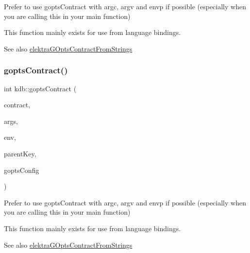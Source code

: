 Prefer to use gopts\+Contract with argc, argv and envp if possible (especially when you are calling this in your main function) 

This function mainly exists for use from language bindings.

\begin{DoxySeeAlso}{See also}
\hyperlink{kdbgopts_8h_ade81f23438c00b284247955e8b4b207d}{elektra\+G\+Opts\+Contract\+From\+Strings} 
\end{DoxySeeAlso}
\mbox{\label{namespacekdb_afa8d46930ac176c22c7f4e77c776d08e}} 
\subsubsection{\texorpdfstring{gopts\+Contract()}{goptsContract()}\hspace{0.1cm}{\footnotesize\ttfamily [3/3]}}
{\footnotesize\ttfamily int kdb\+::gopts\+Contract (\begin{DoxyParamCaption}\item[{\hyperlink{classkdb_1_1KeySet}{kdb\+::\+Key\+Set} \&}]{contract,  }\item[{const std\+::vector$<$ std\+::string $>$ \&}]{args,  }\item[{const std\+::vector$<$ std\+::string $>$ \&}]{env,  }\item[{const \hyperlink{classkdb_1_1Key}{kdb\+::\+Key} \&}]{parent\+Key,  }\item[{\hyperlink{classkdb_1_1KeySet}{kdb\+::\+Key\+Set} \&}]{gopts\+Config }\end{DoxyParamCaption})\hspace{0.3cm}{\ttfamily [inline]}}



Prefer to use gopts\+Contract with argc, argv and envp if possible (especially when you are calling this in your main function) 

This function mainly exists for use from language bindings.

\begin{DoxySeeAlso}{See also}
\hyperlink{kdbgopts_8h_ade81f23438c00b284247955e8b4b207d}{elektra\+G\+Opts\+Contract\+From\+Strings} 
\end{DoxySeeAlso}
\mbox{\label{namespacekdb_a53a162c7ff73150a3f6e6ab9d191aab0}} 
